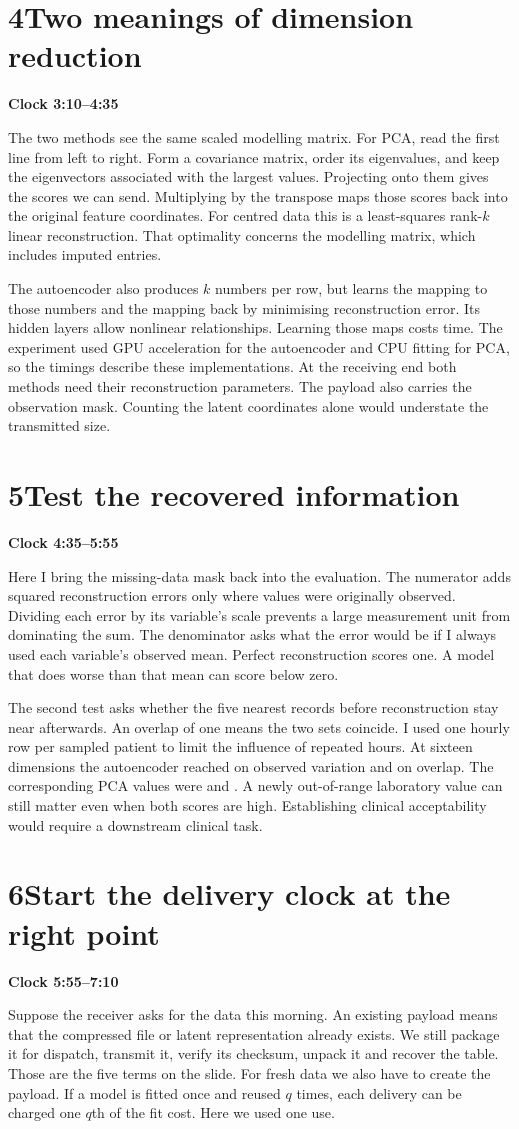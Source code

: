 \documentclass[11pt,a4paper]{article}
\newcommand{\cue}[3]{\section*{\color{forest}#1\quad #2}\textbf{Clock #3}\par}
\begin{document}
\cue{4}{Two meanings of dimension reduction}{3:10--4:35}
The two methods see the same scaled modelling matrix. For PCA, read the first line from left to right. Form a covariance matrix, order its eigenvalues, and keep the eigenvectors associated with the largest values. Projecting onto them gives the scores we can send. Multiplying by the transpose maps those scores back into the original feature coordinates. For centred data this is a least-squares rank-$k$ linear reconstruction. That optimality concerns the modelling matrix, which includes imputed entries.

The autoencoder also produces $k$ numbers per row, but learns the mapping to those numbers and the mapping back by minimising reconstruction error. Its hidden layers allow nonlinear relationships. Learning those maps costs time. The experiment used GPU acceleration for the autoencoder and CPU fitting for PCA, so the timings describe these implementations. At the receiving end both methods need their reconstruction parameters. The payload also carries the observation mask. Counting the latent coordinates alone would understate the transmitted size.

\newpage
\cue{5}{Test the recovered information}{4:35--5:55}
Here I bring the missing-data mask back into the evaluation. The numerator adds squared reconstruction errors only where values were originally observed. Dividing each error by its variable's scale prevents a large measurement unit from dominating the sum. The denominator asks what the error would be if I always used each variable's observed mean. Perfect reconstruction scores one. A model that does worse than that mean can score below zero.

The second test asks whether the five nearest records before reconstruction stay near afterwards. An overlap of one means the two sets coincide. I used one hourly row per sampled patient to limit the influence of repeated hours. At sixteen dimensions the autoencoder reached \studyAeRSq{} on observed variation and \studyAeOverlap{} on overlap. The corresponding PCA values were \studyPcaRSq{} and \studyPcaOverlap. A newly out-of-range laboratory value can still matter even when both scores are high. Establishing clinical acceptability would require a downstream clinical task.

\cue{6}{Start the delivery clock at the right point}{5:55--7:10}
Suppose the receiver asks for the data this morning. An existing payload means that the compressed file or latent representation already exists. We still package it for dispatch, transmit it, verify its checksum, unpack it and recover the table. Those are the five terms on the slide. For fresh data we also have to create the payload. If a model is fitted once and reused $q$ times, each delivery can be charged one $q$th of the fit cost. Here we used one use.
\end{document}
